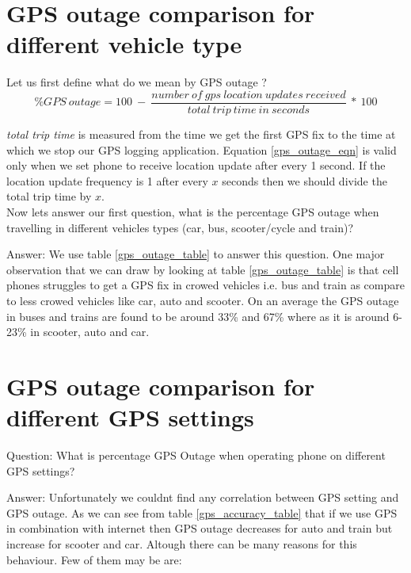 \documentclass[12pt]{report}
\begin{document}
\section{GPS outage comparison for different vehicle type}
\label{sec:gps_outage}
Let us first define what do we mean by GPS outage ?
\begin{equation}\label{gps_outage_eqn}
  \%GPS\  outage = 100 \  - \  \frac{number\  of\  gps\  location\  updates\  received}{total\  trip\  time\  in\  seconds}\  *\  100
\end{equation}

\noindent
\textit{total trip time} is measured from the time we get the first GPS fix to
the time at which we stop our GPS logging application. Equation
\ref{gps_outage_eqn} is valid only when we set phone to receive location update
after every 1 second. If the location update frequency is 1 after every $x$
seconds then we should divide the total trip time by $x$.
\\

Now lets answer our first question, what is the percentage GPS outage when
travelling in different vehicles types (car, bus, scooter/cycle and train)?

Answer: We use table \ref{gps_outage_table} to answer this question.
One major observation that we can draw by looking at table
\ref{gps_outage_table} is that cell phones struggles to get a GPS fix in crowed
vehicles i.e. bus and train as compare to less crowed vehicles like car, auto
and scooter. On an average the GPS outage in buses and trains are found to be
around 33\% and 67\% where as it is around 6-23\% in scooter, auto and car.

\section{GPS outage comparison for different GPS settings}

Question: What is percentage GPS Outage when operating phone on different GPS
settings?

Answer: Unfortunately we couldn\textquotesingle{}t find any correlation between
GPS setting and GPS outage. As we can see from table \ref{gps_accuracy_table}
that if we use GPS in combination with internet then GPS outage decreases for
auto and train but increase for scooter and car. Altough there can be many
reasons for this behaviour. Few of them may be are:
\end{document}
